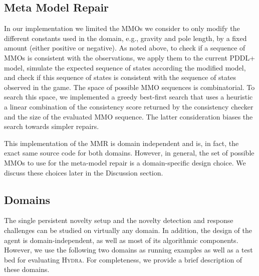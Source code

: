 \documentclass[sigconf]{aamas}
\newcommand{\hydra}{\textsc{Hydra}\xspace} %
\begin{document}
\subsection{Meta Model Repair}




In our implementation we limited the MMOs we consider to only modify the different constants used in the domain, e.g., gravity and pole length, by a fixed amount (either positive or negative). 
As noted above, to check if a sequence of MMOs is consistent with the observations, we apply them to the current PDDL+ model, simulate the expected sequence of states according the modified model, 
and check if this sequence of states is consistent with the sequence of states observed in the game. 
The space of possible MMO sequences is combinatorial. 
To search this space, we implemented a greedy best-first search that uses a heuristic a linear combination of the consistency score returned by the consistency checker and the size of the evaluated MMO sequence. 
The latter consideration biases the search towards simpler repairs. 


This implementation of the MMR is domain independent and is, in fact, the exact same source code for both domains.
However, in general, the set of possible MMOs to use for the meta-model repair is a domain-specific design choice. We discuss these choices later in the Discussion section. 





\subsection{Domains}
The single persistent novelty setup and the novelty detection and response challenges can be studied on virtually any domain. In addition, the design of the agent is domain-independent, as well as most of its algorithmic components. 
However, we use the following two domains as running examples as well as a test bed for evaluating \hydra. 
For completeness, we provide a brief description of these domains.
\end{document}
